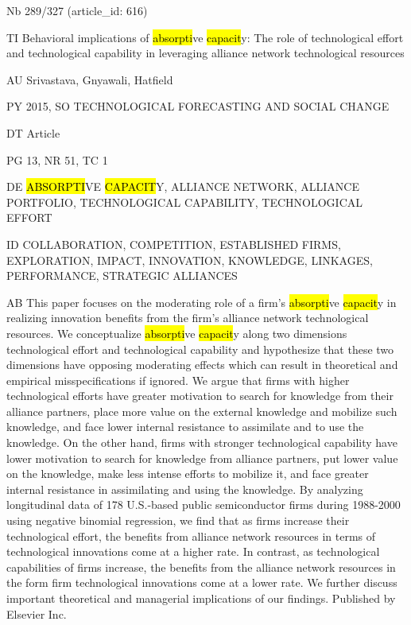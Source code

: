 \documentclass[a4paper]{article}
\begin{document}
\vspace*{-2cm}
Nb \tabto{0cm}289/327 (article\_id: 616)\par
TI \tabto{0cm}Behavioral implications of \hl{absorpti}ve \hl{capacit}y: The role of technological effort and technological capability in leveraging alliance network technological resources\par
AU \tabto{0cm}Srivastava, Gnyawali, Hatfield\par
PY \tabto{0cm}2015, SO TECHNOLOGICAL FORECASTING AND SOCIAL CHANGE\par
DT \tabto{0cm}Article\par
PG \tabto{0cm}13, NR 51, TC 1\par
DE \tabto{0cm}\hl{ABSORPTI}VE \hl{CAPACIT}Y, ALLIANCE NETWORK, ALLIANCE PORTFOLIO, TECHNOLOGICAL CAPABILITY, TECHNOLOGICAL EFFORT\par
ID \tabto{0cm}COLLABORATION, COMPETITION, ESTABLISHED FIRMS, EXPLORATION, IMPACT, INNOVATION, KNOWLEDGE, LINKAGES, PERFORMANCE, STRATEGIC ALLIANCES\par
AB \tabto{0cm}This paper focuses on the moderating role of a firm's \hl{absorpti}ve \hl{capacit}y in realizing innovation benefits from the firm's alliance network technological resources. We conceptualize \hl{absorpti}ve \hl{capacit}y along two dimensions technological effort and technological capability and hypothesize that these two dimensions have opposing moderating effects which can result in theoretical and empirical misspecifications if ignored. We argue that firms with higher technological efforts have greater motivation to search for knowledge from their alliance partners, place more value on the external knowledge and mobilize such knowledge, and face lower internal resistance to assimilate and to use the knowledge. On the other hand, firms with stronger technological capability have lower motivation to search for knowledge from alliance partners, put lower value on the knowledge, make less intense efforts to mobilize it, and face greater internal resistance in assimilating and using the knowledge. By analyzing longitudinal data of 178 U.S.-based public semiconductor firms during 1988-2000 using negative binomial regression, we find that as firms increase their technological effort, the benefits from alliance network resources in terms of technological innovations come at a higher rate. In contrast, as technological capabilities of firms increase, the benefits from the alliance network resources in the form firm technological innovations come at a lower rate. We further discuss important theoretical and managerial implications of our findings. Published by Elsevier Inc.\par
\clearpage
\end{document}
